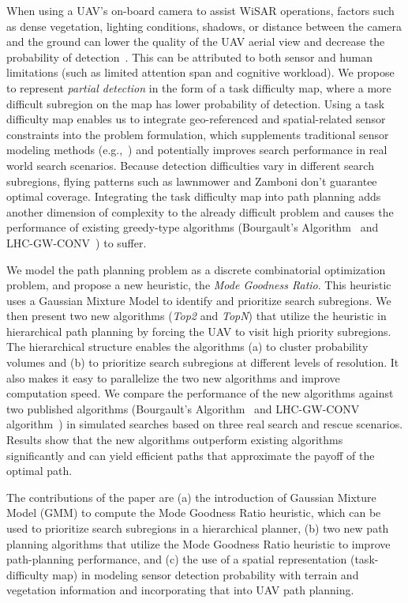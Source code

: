 \documentclass[journal]{IEEEtran}
\begin{document}
When using a UAV's on-board camera to assist WiSAR operations, factors such as dense vegetation, lighting conditions, shadows, or distance between the camera and the ground can lower the quality of the UAV aerial view and decrease the probability of detection~\cite{morse2010uav}. This can be attributed to both sensor and human limitations (such as limited attention span and cognitive workload). We propose to represent \textit{partial detection} in the form of a task difficulty map, where a more difficult subregion on the map has lower probability of detection. Using a task difficulty map enables us to integrate geo-referenced and spatial-related sensor constraints into the problem formulation, which supplements traditional sensor modeling methods (e.g.,~\cite{Bourgault2006}) and potentially improves search performance in real world search scenarios. Because detection difficulties vary in different search subregions, flying patterns such as lawnmower and Zamboni don't guarantee optimal coverage. Integrating the task difficulty map into path planning adds another dimension of complexity to the already difficult problem and causes the performance of existing greedy-type algorithms (Bourgault's Algorithm~\cite{Bourgault2006} and LHC-GW-CONV~\cite{lin2009uav}) to suffer.

We model the path planning problem as a discrete combinatorial optimization problem, and propose a new heuristic, the \textit{Mode Goodness Ratio}. This heuristic uses a Gaussian Mixture Model to identify and prioritize search subregions. We then present two new algorithms (\textit{Top2} and \textit{TopN}) that utilize the heuristic in hierarchical path planning by forcing the UAV to visit high priority subregions. The hierarchical structure enables the algorithms (a) to cluster probability volumes and (b) to prioritize search subregions at different levels of resolution. It also makes it easy to parallelize the two new algorithms and improve computation speed. We compare the performance of the new algorithms against two published algorithms (Bourgault's Algorithm~\cite{Bourgault2006} and LHC-GW-CONV algorithm~\cite{lin2009uav}) in simulated searches based on three real search and rescue scenarios. Results show that the new algorithms outperform existing algorithms significantly and can yield efficient paths that approximate the payoff of the optimal path.

The contributions of the paper are (a) the introduction of Gaussian Mixture Model (GMM) to compute the Mode Goodness Ratio heuristic, which can be used to prioritize search subregions in a hierarchical planner, (b) two new path planning algorithms that utilize the Mode Goodness Ratio heuristic to improve path-planning performance, and (c) the use of a spatial representation (task-difficulty map) in modeling sensor detection probability with terrain and vegetation information and incorporating that into UAV path planning.
\end{document}
